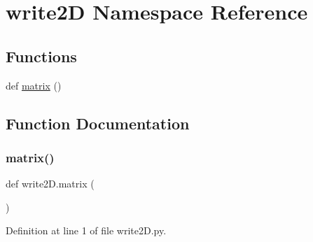 \hypertarget{namespacewrite2_d}{}\section{write2D Namespace Reference}
\label{namespacewrite2_d}
\subsection*{Functions}
\begin{DoxyCompactItemize}
\item 
def \mbox{\hyperlink{namespacewrite2_d_abfd1c85cc3c9f9aca56c17266209721d}{matrix}} ()
\end{DoxyCompactItemize}


\subsection{Function Documentation}
\mbox{\label{namespacewrite2_d_abfd1c85cc3c9f9aca56c17266209721d}} 
\subsubsection{\texorpdfstring{matrix()}{matrix()}}
{\footnotesize\ttfamily def write2\+D.\+matrix (\begin{DoxyParamCaption}{ }\end{DoxyParamCaption})}



Definition at line 1 of file write2\+D.\+py.

